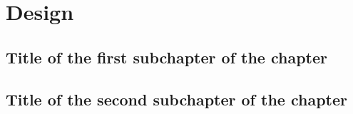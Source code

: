 \chapter{Design}

\section{Title of the first subchapter of the chapter}

\section{Title of the second subchapter of the chapter}

